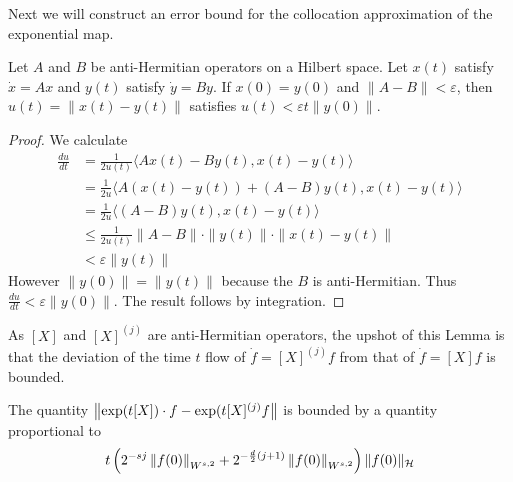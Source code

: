 Next we will construct an error bound for the collocation approximation of the exponential map.

\begin{lemma}
Let $A$ and $B$ be anti-Hermitian operators on a Hilbert space.  Let $x(t)$ satisfy $\dot{x} = Ax$ and $y(t)$ satisfy $\dot{y} = By$.  If $x(0) = y(0)$ and $\| A - B \| < \varepsilon$, then $u(t) = \| x(t) - y(t) \|$ satisfies $u(t) < \varepsilon t  \| y(0) \|$.
\end{lemma}

\begin{proof}
	We calculate
	\begin{align*}
		\frac{du}{dt} &= \frac{1}{2u(t)} \langle Ax(t) - By(t) , x(t) - y(t) \rangle \\
			&= \frac{1}{2u} \langle A(x(t)-y(t)) + (A-B) y(t) , x(t) - y(t) \rangle \\
			&= \frac{1}{2u} \langle (A-B)y(t) , x(t) - y(t) \rangle \\
			&\leq \frac{1}{2u(t)} \| A - B \| \cdot \| y(t) \| \cdot \| x(t) - y(t) \| \\
			&< \varepsilon \| y(t) \|
	\end{align*}
	However $\| y(0) \| = \| y(t)\|$ because the $B$ is anti-Hermitian.  Thus $\frac{du}{dt} < \varepsilon \| y(0)\|$.	The result follows by integration.
\end{proof}
As $[X]$ and $[X]^{(j)}$ are anti-Hermitian operators, the upshot of this Lemma is that the deviation of the time $t$ flow of $\dot{f} = [X]^{(j)} f$ from that of $\dot{f} = [X] f$ is bounded.

\begin{theorem}
The quantity $\left\|  \exp(t [X]) \cdot f - \exp(t [X]^{(j)} f  \right\|$ is bounded by a quantity proportional to 
\[
 	t \left( 2^{-sj}\left\| f(0) \right\|_{W^{s,2}} + 2^{-\frac{d}{2}(j+1)}\left\| f(0) \right\|_{W^{s,2}} \right) \| f (0) \|_{\mathcal{H}}
\]
\end{theorem}
